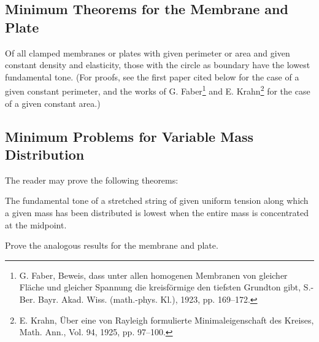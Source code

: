 \subsection{Minimum Theorems for the Membrane and Plate}
Of all clamped membranes or plates with given perimeter or area and given constant density and elasticity, those with the circle as boundary have the lowest fundamental tone. (For proofs, see the first paper cited below for the case of a given constant perimeter, and the works of G. Faber\footnote{G. Faber, Beweis, dass unter allen homogenen Membranen von gleicher Fläche und gleicher Spannung die kreisförmige den tiefsten Grundton gibt, S.-Ber. Bayr. Akad. Wiss. (math.-phys. Kl.), 1923, pp. 169--172.} and E. Krahn\footnote{E. Krahn, Über eine von Rayleigh formulierte Minimaleigenschaft des Kreises, Math. Ann., Vol. 94, 1925, pp. 97--100.} for the case of a given constant area.)

\subsection{Minimum Problems for Variable Mass Distribution}
The reader may prove the following theorems:

The fundamental tone of a stretched string of given uniform tension along which a given mass has been distributed is lowest when the entire mass is concentrated at the midpoint.

Prove the analogous results for the membrane and plate.

